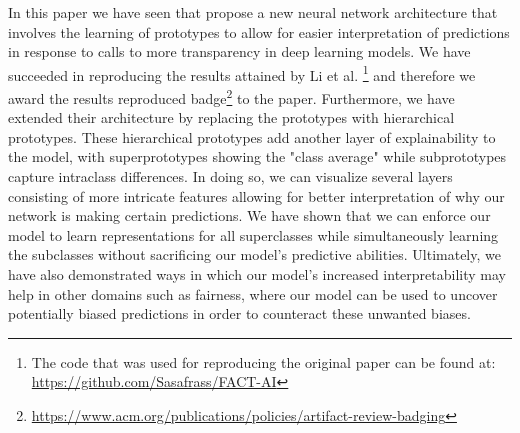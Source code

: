 In this paper we have seen that \citeauthor{li2018deep} propose a new neural network architecture that involves the learning of prototypes to allow for easier interpretation of predictions in response to calls to more transparency in deep learning models. We have succeeded in reproducing the results attained by Li et al. \citep{li2018deep}\footnote{The code that was used for reproducing the original paper can be found at: \url{https://github.com/Sasafrass/FACT-AI}} and therefore we award the results reproduced badge\footnote{\url{https://www.acm.org/publications/policies/artifact-review-badging}} to the paper. Furthermore, we have extended their architecture by replacing the prototypes with hierarchical prototypes. These hierarchical prototypes add another layer of explainability to the model, with superprototypes showing the "class average" while subprototypes capture intraclass differences. In doing so, we can visualize several layers consisting of more intricate features allowing for better interpretation of why our network is making certain predictions. We have shown that we can enforce our model to learn representations for all superclasses while simultaneously learning the subclasses without sacrificing our model's predictive abilities. Ultimately, we have also demonstrated ways in which our model's increased interpretability may help in other domains such as fairness, where our model can be used to uncover potentially biased predictions in order to counteract these unwanted biases. 

